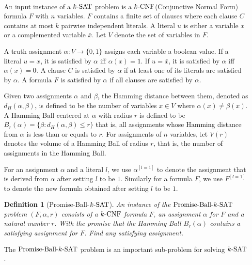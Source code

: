 \documentclass[a4paper,12pts]{article}
\newcommand{\SAT}{\textnormal{$k$-SAT}}
\newcommand{\CNF}{\textnormal{$k$-CNF}}
\newcommand{\dist}[2]{d_H(#1,#2)}
\newcommand{\ball}[2]{B_{#1}(#2)}
\newcommand{\PBS}{\textnormal{Promise-Ball-$\SAT$}}
\newtheorem{definition}{Definition}
\begin{document}
\paragraph{} An input instance of a $\SAT$ problem is a $\CNF$(Conjunctive Normal Form) formula $F$ with $n$ variables. $F$ contains a finite set of clauses where each clause $C$ contains at most $k$ pairwise independent literals. A literal $u$ is either a variable $x$ or a complemented variable $\bar{x}$. Let $V$ denote the set of variables in $F$. \par 
A truth assignment $\alpha: V\rightarrow \{0,1\}$ assigns each variable a boolean value. If a literal $u = x$, it is satisfied by $\alpha$ iff $\alpha(x) = 1$. If $u = \bar{x}$, it is satisfied by $\alpha$ iff $\alpha(x) = 0$. A clause $C$ is satisfied by $\alpha$ if at least one of its literals are satisfied by $\alpha$. A formula $F$ is satisfied by $\alpha$ if all clauses are satisfied by $\alpha$. \par 
Given two assignments $\alpha$ and $\beta$, the Hamming distance between them, denoted as $\dist{\alpha}{\beta}$, is defined to be the number of variables $x \in V$ where $\alpha(x) \neq \beta(x)$. A Hamming Ball centered at $\alpha$ with radius $r$ is defined to be $\ball{r}{\alpha} = \{\beta: \dist{\alpha}{\beta} \leq r\}$ that is, all assignments whose Hamming distance from $\alpha$ is less than or equals to $r$. For assignments of $n$ variables, let $V(r)$ denotes the volume of a Hamming Ball of radius $r$, that is, the number of assignments in the Hamming Ball.\par 
For an assignment $\alpha$ and a literal $l$, we use $\alpha^{[l = 1]}$ to denote the assignment that is derived from $\alpha$ after setting $l$ to be $1$. Similarly for a formula $F$, we use $F^{[l = 1]}$ to denote the new formula obtained after setting $l$ to be $1$. \par 
\begin{definition}[\PBS\cite{Moser11}]
	An instance of the $\PBS$ problem $(F,\alpha,r)$ consists of a $\CNF$ formula $F$, an assignment $\alpha$ for $F$ and a natural number $r$. With the promise that the Hamming Ball $\ball{r}{\alpha}$ contains a satisfying assignment for $F$. Find any satisfying assignment.
\end{definition}
The $\PBS$ problem is an important sub-problem for solving $\SAT$. 
\end{document}
